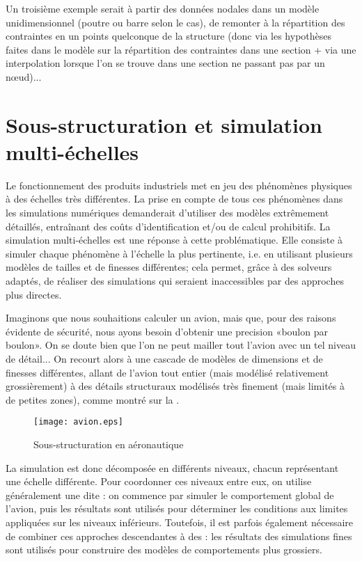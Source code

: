 \medskip
Un troisième exemple serait à partir des données nodales dans un modèle unidimensionnel (poutre ou barre selon le cas), de remonter à la répartition des contraintes en un points quelconque de la structure (donc via les hypothèses faites dans le modèle sur la répartition des contraintes dans une section + via une interpolation lorsque l'on se trouve dans une section ne passant pas par un nœud)...



\medskip
\section{Sous-structuration et simulation multi-échelles}\label{Sec-ssstruc}

Le fonctionnement des produits industriels met en jeu des phénomènes physiques à des échelles très différentes. La prise en compte de tous ces phénomènes dans les simulations numériques demanderait d'utiliser des modèles extrêmement détaillés, entraînant des coûts d'identification et/ou de calcul prohibitifs. La simulation multi-échelles est une réponse à cette problématique. Elle consiste à simuler chaque phénomène à l'échelle la plus pertinente, i.e. en utilisant plusieurs modèles de tailles et de finesses différentes; cela permet, grâce à des solveurs adaptés, de réaliser des simulations qui seraient inaccessibles par des approches plus directes.

\medskip
Imaginons que nous souhaitions calculer un avion, mais que, pour des raisons évidente de sécurité, nous ayons besoin d'obtenir une precision «boulon par boulon». On se doute bien que l'on ne peut mailler tout l'avion avec un tel niveau de détail... On recourt alors à une cascade de modèles de dimensions et de finesses différentes, allant de l'avion tout entier (mais modélisé relativement grossièrement) à des détails structuraux modélisés très finement (mais limités à de petites zones), comme montré sur la .
\begin{figure}[ht]
\centering\texttt{[image: avion.eps]}
\caption{Sous-structuration en aéronautique}\label{Fig-avion}
\end{figure}

La simulation est donc décomposée en différents niveaux, chacun représentant une échelle différente. Pour coordonner ces niveaux entre eux, on utilise généralement une  dite : on commence par simuler le comportement global de l'avion, puis les résultats sont utilisés pour déterminer les conditions aux limites appliquées sur les niveaux inférieurs. Toutefois, il est parfois également nécessaire de combiner ces approches descendantes
à des : les résultats des simulations fines sont utilisés pour construire des modèles de comportements plus grossiers.

